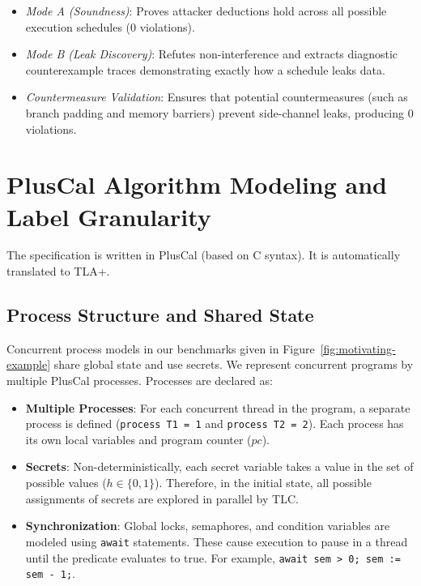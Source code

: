 \documentclass[a4paper,12pt]{report}
\begin{document}
\begin{enumerate}[label=\textbf{Stage \arabic*:}, leftmargin=1.9cm, itemsep=0.2em, topsep=0.15em]
    \begin{itemize}[itemsep=0.1em, topsep=0.1em]
        \item \emph{Mode A (Soundness)}: Proves attacker deductions hold across all possible execution schedules (0 violations).
        \item \emph{Mode B (Leak Discovery)}: Refutes non-interference and extracts diagnostic counterexample traces demonstrating exactly how a schedule leaks data.
        \item \emph{Countermeasure Validation}: Ensures that potential countermeasures (such as branch padding and memory barriers) prevent side-channel leaks, producing 0 violations.
    \end{itemize}
\end{enumerate}

\section{PlusCal Algorithm Modeling and Label Granularity}
The specification is written in PlusCal (based on C syntax). It is automatically translated to TLA+.

\subsection{Process Structure and Shared State}
Concurrent process models in our benchmarks given in Figure~\ref{fig:motivating-example} share global state and use secrets. We represent concurrent programs by multiple PlusCal processes. Processes are declared as:
\begin{itemize}[itemsep=0.2em, topsep=0.15em]
    \item \textbf{Multiple Processes}: For each concurrent thread in the program, a separate process is defined (\texttt{process T1 = 1} and \texttt{process T2 = 2}). Each process has its own local variables and program counter ($pc$).
    \item \textbf{Secrets}: Non-deterministically, each secret variable takes a value in the set of possible values ($h \in \{0, 1\}$). Therefore, in the initial state, all possible assignments of secrets are explored in parallel by TLC.
    \item \textbf{Synchronization}: Global locks, semaphores, and condition variables are modeled using \texttt{await} statements. These cause execution to pause in a thread until the predicate evaluates to true. For example, \texttt{await sem > 0; sem := sem - 1;}.
\end{itemize}
\end{document}
